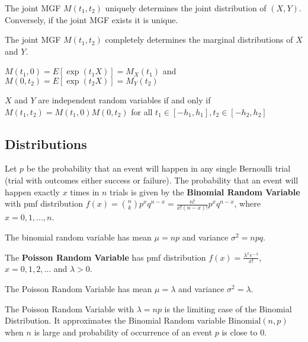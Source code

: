 \begin{thm}
    The joint MGF $M(t_1, t_2)$ uniquely determines the joint distribution of $(X, Y)$.
    Conversely, if the joint MGF exists it is unique.
\end{thm}

\begin{thm}
    The joint MGF $M(t_1, t_2)$ completely determines the marginal distributions of $X$ and $Y$.

    $M(t_1, 0) = E[\exp(t_1 X)] = M_X (t_1)$ and $M(0, t_2) = E[\exp(t_2 X)] = M_Y(t_2)$
\end{thm}

\begin{thm}
    $X$ and $Y$ are independent random variables if and only if $M(t_1, t_2) = M(t_1, 0) M(0, t_2)$ for all $t_1 \in [-h_1, h_1], t_2 \in [-h_2, h_2]$
\end{thm}

\subsection{Distributions}

\begin{defn}
    Let $p$ be the probability that an event will happen in any single Bernoulli trial (trial with outcomes either success or failure). The probability that an event will happen exactly $x$ times in $n$ trials is given by the \textbf{Binomial Random Variable} with pmf distribution $f(x) = {n \choose k} p^x q^{n-x} = \displaystyle \frac{n!}{x! (n-x)!} p^x q^{n-x}$, where $x = 0, 1, ... , n$.
\end{defn}

The binomial random variable has mean $\mu = np$ and variance $\sigma^2 = npq$.

\begin{defn}
    The \textbf{Poisson Random Variable} has pmf distribution $f(x) = \displaystyle \frac{\lambda^x e^{-\lambda}}{x!}$, $x = 0, 1, 2, ...$ and $\lambda > 0$.
\end{defn}

The Poisson Random Variable has mean $\mu = \lambda$ and variance $\sigma^2 = \lambda$.
\begin{prop}
    The Poisson Random Variable with $\lambda = np$ is the limiting case of the Binomial Distribution. It approximates the Binomial Random variable $\text{Binomial}(n,p)$ when $n$ is large and probability of occurrence of an event $p$ is close to $0$.
\end{prop}

